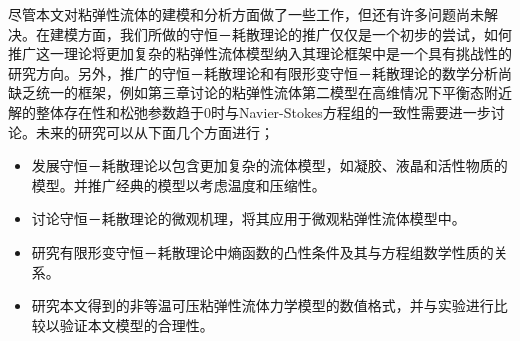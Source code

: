 尽管本文对粘弹性流体的建模和分析方面做了一些工作，但还有许多问题尚未解决。在建模方面，我们所做的守恒－耗散理论的推广仅仅是一个初步的尝试，如何推广这一理论将更加复杂的粘弹性流体模型纳入其理论框架中是一个具有挑战性的研究方向。另外，推广的守恒－耗散理论和有限形变守恒－耗散理论的数学分析尚缺乏统一的框架，例如第三章讨论的粘弹性流体第二模型在高维情况下平衡态附近解的整体存在性和松弛参数趋于$0$时与Navier-Stokes方程组的一致性需要进一步讨论。未来的研究可以从下面几个方面进行；
\begin{itemize}
	\item 发展守恒－耗散理论以包含更加复杂的流体模型，如凝胶、液晶和活性物质的模型。并推广经典的模型以考虑温度和压缩性。
	\item 讨论守恒－耗散理论的微观机理，将其应用于微观粘弹性流体模型中。
	\item 研究有限形变守恒－耗散理论中熵函数的凸性条件及其与方程组数学性质的关系。
	\item 研究本文得到的非等温可压粘弹性流体力学模型的数值格式，并与实验进行比较以验证本文模型的合理性。
\end{itemize}

% 